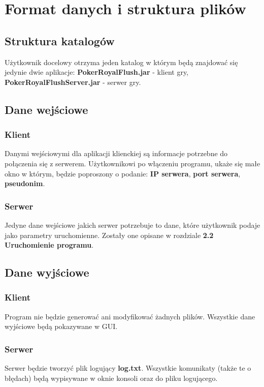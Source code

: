 \documentclass{article}
\begin{document}
\section{Format danych i struktura plików}
    \subsection{Struktura katalogów}
        Użytkownik docelowy otrzyma jeden katalog w którym będą znajdować się jedynie dwie aplikacje: \textbf{PokerRoyalFlush.jar} - klient gry, \textbf{PokerRoyalFlushServer.jar} - serwer gry.
    
    \subsection{Dane wejściowe}
        \subsubsection{Klient}
            Danymi wejściowymi dla aplikacji klienckiej są informacje potrzebne do połączenia się z serwerem.
            Użytkownikowi po włączeniu programu, ukaże się małe okno w którym, będzie poproszony o podanie: \textbf{IP serwera}, \textbf{port serwera}, \textbf{pseudonim}.
        
        \subsubsection{Serwer}
            Jedyne dane wejściowe jakich serwer potrzebuje to dane, które użytkownik podaje jako parametry uruchomienne. Zostały one opisane w rozdziale \textbf{2.2 Uruchomienie programu}.
    
    \subsection{Dane wyjściowe}
        \subsubsection{Klient}
            Program nie będzie generować ani modyfikować żadnych plików. Wszystkie dane wyjściowe będą pokazywane w GUI.
        
        \subsubsection{Serwer}
            Serwer będzie tworzyć plik logujący \textbf{log.txt}. Wszystkie komunikaty (także te o błędach) będą wypisywane w oknie konsoli oraz do pliku logującego.
\end{document}
